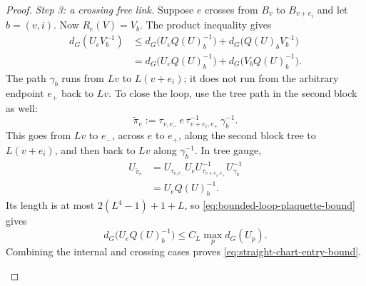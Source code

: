 \documentclass[10pt,reqno]{amsart}
\theoremstyle{definition}
\theoremstyle{remark}
\numberwithin{equation}{section}
\numberwithin{figure}{section}
\begin{document}
\begin{proof}
\emph{Step 3: a crossing free link.}
Suppose $e$ crosses from $B_v$ to $B_{v+e_i}$ and let $b=(v,i)$.
Now $R_e(V)=V_b$. The product inequality gives
\begin{equation}\label{eq:crossing-mismatch-split}
\begin{aligned}
d_G(U_eV_b^{-1})
&\le d_G\bigl(U_eQ(U)_b^{-1}\bigr)
+d_G\bigl(Q(U)_bV_b^{-1}\bigr)\\
&=d_G\bigl(U_eQ(U)_b^{-1}\bigr)
+d_G\bigl(V_bQ(U)_b^{-1}\bigr).
\end{aligned}
\end{equation}
The path $\gamma_b$ runs from $Lv$ to $L(v+e_i)$; it does not run
from the arbitrary endpoint $e_+$ back to $Lv$. To close the loop, use
the tree path in the second block as well:
\begin{equation}\label{eq:crossing-tree-loop}
\widetilde\pi_e:=\tau_{v,e_-}\,e\,
\tau_{v+e_i,e_+}^{-1}\,\gamma_b^{-1}.
\end{equation}
This goes from $Lv$ to $e_-$, across $e$ to $e_+$, along the second
block tree to $L(v+e_i)$, and then back to $Lv$ along $\gamma_b^{-1}$.
In tree gauge,
\begin{equation}\label{eq:crossing-tree-loop-holonomy}
\begin{aligned}
U_{\widetilde\pi_e}
&=U_{\tau_{v,e_-}}U_eU_{\tau_{v+e_i,e_+}}^{-1}U_{\gamma_b}^{-1}\\
&=U_eQ(U)_b^{-1}.
\end{aligned}
\end{equation}
Its length is at most $2(L^4-1)+1+L$, so
\eqref{eq:bounded-loop-plaquette-bound} gives
\begin{equation}\label{eq:crossing-plaquette-comparison}
d_G\bigl(U_eQ(U)_b^{-1}\bigr)\le C_L\max_p d_G(U_p).
\end{equation}
Combining the internal and crossing cases proves
\eqref{eq:straight-chart-entry-bound}.
\begin{figure}[htbp]
\centering
{}
\end{figure}
\end{proof}
\end{document}
